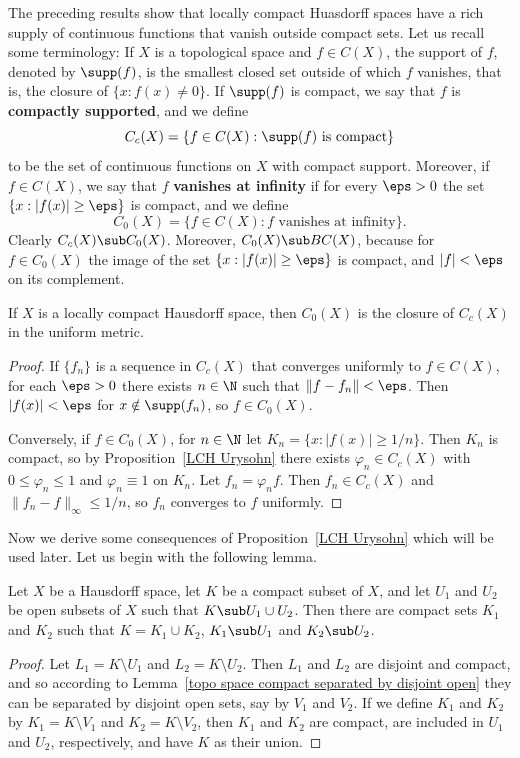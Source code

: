 The preceding results show that locally compact Huasdorff spaces have a rich supply of continuous functions that vanish outside compact sets. Let us recall some terminology: If $X$ is a topological space and $f\in C(X)$, the support of $f$, denoted by $\supp(f)$, is the smallest closed set outside of which $f$ vanishes, that is, the closure of $\{x:f(x)\neq 0\}$. If $\supp(f)$ is compact, we say that $f$ is \textbf{compactly supported}, and we define
\[C_c(X)=\{f\in C(X):\text{$\supp(f)$ is compact}\}\]
to be the set of continuous functions on $X$ with compact support. Moreover, if $f\in C(X)$, we say that $f$ \textbf{vanishes at infinity} if for every $\eps>0$ the set $\{x:|f(x)|\geq\eps\}$ is compact, and we define
\[C_0(X)=\{f\in C(X):\text{$f$ vanishes at infinity}\}.\]
Clearly $C_c(X)\sub C_0(X)$. Moreover, $C_0(X)\sub BC(X)$, because for $f\in C_0(X)$ the image of the set $\{x:|f(x)|\geq\eps\}$ is compact, and $|f|<\eps$ on its complement.
\begin{proposition}\label{LCH C_0(X) is closure of C_c(X)}
If $X$ is a locally compact Hausdorff space, then $C_0(X)$ is the closure of $C_c(X)$ in the uniform metric.
\end{proposition}
\begin{proof}
If $\{f_n\}$ is a sequence in $C_c(X)$ that converges uniformly to $f\in C(X)$, for each $\eps>0$ there exists $n\in\N$ such that $\|f-f_n\|<\eps$. Then $|f(x)|<\eps$ for $x\notin\supp(f_n)$, so $f\in C_0(X)$.\par
Conversely, if $f\in C_0(X)$, for $n\in\N$ let $K_n=\{x:|f(x)|\geq 1/n\}$. Then $K_n$ is compact, so by Proposition~\ref{LCH Urysohn} there exists $\varphi_n\in C_c(X)$ with $0\leq\varphi_n\leq 1$ and $\varphi_n\equiv 1$ on $K_n$. Let $f_n=\varphi_nf$. Then $f_n\in C_c(X)$ and $\|f_n-f\|_{\infty}\leq 1/n$, so $f_n$ converges to $f$ uniformly.
\end{proof}
Now we derive some consequences of Proposition~\ref{LCH Urysohn} which will be used later. Let us begin with the following lemma.
\begin{lemma}\label{compact set separated by open union}
Let $X$ be a Hausdorff space, let $K$ be a compact subset of $X$, and let $U_1$ and $U_2$ be open subsets of $X$ such that $K\sub U_1\cup U_2$. Then there are compact sets $K_1$ and $K_2$ such that $K=K_1\cup K_2$, $K_1\sub U_1$ and $K_2\sub U_2$.
\end{lemma}
\begin{proof}
Let $L_1=K\setminus U_1$ and $L_2=K\setminus U_2$. Then $L_1$ and $L_2$ are disjoint and compact, and so according to Lemma~\ref{topo space compact separated by disjoint open} they can be separated by disjoint open sets, say by $V_1$ and $V_2$. If we define $K_1$ and $K_2$ by $K_1=K\setminus V_1$ and $K_2=K\setminus V_2$, then $K_1$ and $K_2$ are compact, are included in $U_1$ and $U_2$, respectively, and have $K$ as their union.
\end{proof}

